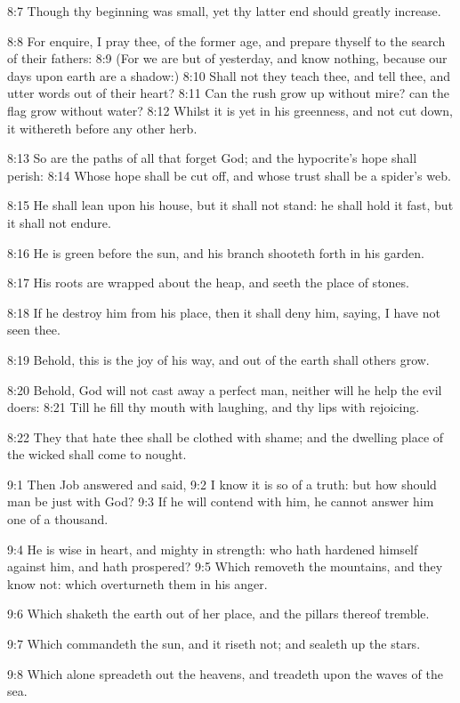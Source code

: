 8:7 Though thy beginning was small, yet thy latter end should greatly increase.

8:8 For enquire, I pray thee, of the former age, and prepare thyself to the search of their fathers: 8:9 (For we are but of yesterday, and know nothing, because our days upon earth are a shadow:) 8:10 Shall not they teach thee, and tell thee, and utter words out of their heart?  8:11 Can the rush grow up without mire? can the flag grow without water?  8:12 Whilst it is yet in his greenness, and not cut down, it withereth before any other herb.

8:13 So are the paths of all that forget God; and the hypocrite's hope shall perish: 8:14 Whose hope shall be cut off, and whose trust shall be a spider's web.

8:15 He shall lean upon his house, but it shall not stand: he shall hold it fast, but it shall not endure.

8:16 He is green before the sun, and his branch shooteth forth in his garden.

8:17 His roots are wrapped about the heap, and seeth the place of stones.

8:18 If he destroy him from his place, then it shall deny him, saying, I have not seen thee.

8:19 Behold, this is the joy of his way, and out of the earth shall others grow.

8:20 Behold, God will not cast away a perfect man, neither will he help the evil doers: 8:21 Till he fill thy mouth with laughing, and thy lips with rejoicing.

8:22 They that hate thee shall be clothed with shame; and the dwelling place of the wicked shall come to nought.

9:1 Then Job answered and said, 9:2 I know it is so of a truth: but how should man be just with God?  9:3 If he will contend with him, he cannot answer him one of a thousand.

9:4 He is wise in heart, and mighty in strength: who hath hardened himself against him, and hath prospered?  9:5 Which removeth the mountains, and they know not: which overturneth them in his anger.

9:6 Which shaketh the earth out of her place, and the pillars thereof tremble.

9:7 Which commandeth the sun, and it riseth not; and sealeth up the stars.

9:8 Which alone spreadeth out the heavens, and treadeth upon the waves of the sea.

